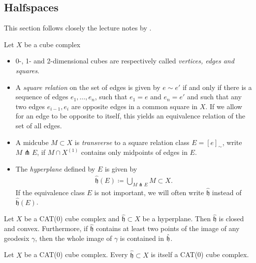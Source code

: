 \subsection{Halfspaces}
\label{sec:halfspaces}

This section follows closely the lecture notes by \textcite{Rolli2012}.

\begin{defin}[Hyperplanes]
  Let \(X\) be a cube complex
  \begin{itemize}
  \item 0-, 1- and 2-dimensional cubes are respectively called \emph{vertices, edges and squares}.
  \item A \emph{square relation} on the set of edges is given by \(e \sim e'\) if and only if there is a sequence of edges \(e_1, \dots, e_n\), such that \(e_1 = e\) and \(e_n = e'\) and such that any two edges \(e_{i-1}, e_i\) are opposite edges in a common square in \(X\). If we allow for an edge to be opposite to itself, this yields an equivalence relation of the set of all edges.
  \item A midcube \(M \subset X\) is \emph{transverse} to a square relation class \(E = [e]_\sim\), write \(M \pitchfork E\), if \(M \cap X^{(1)}\) contains only midpoints of edges in \(E\).
  \item The \emph{hyperplane} defined by \(E\) is given by
    \begin{align*}
      \mathfrak{\hat h}(E) \coloneqq \bigcup_{M \pitchfork E} M \subset X.
    \end{align*}
    If the equivalence class \(E\) is not important, we will often write \(\mathfrak{\hat h}\) instead of \(\mathfrak{\hat h}(E)\).
  \end{itemize}
\end{defin}

\begin{bsp}
\end{bsp}

\begin{prop}
  Let \(X\) be a CAT(0) cube complex and \(\mathfrak{\hat h} \subset X\) be a hyperplane. Then \(\mathfrak{\hat h}\) is closed and convex. Furthermore, if \(\mathfrak{\hat h}\) contains at least two points of the image of any geodesix \(\gamma\), then the whole image of \(\gamma\) is contained in \(\mathfrak{\hat h}\).
\end{prop}

\begin{cor}
  Let \(X\) be a CAT(0) cube complex. Every \(\mathfrak{\hat h} \subset X\) is itself a CAT(0) cube complex.
\end{cor}

